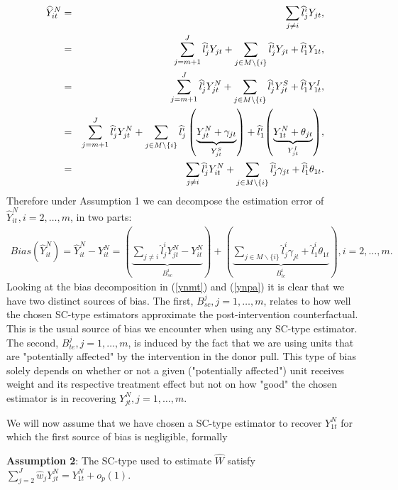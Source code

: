 \begin{eqnarray}
\widehat{Y}_{it}^N&=& \sum_{j\neq i} \widehat{l}_{j}^{i}Y_{jt}\notag,\\&=&\sum_{j=m+1}^J \widehat{l}_{j}^{i}Y_{jt}+ \sum_{j \in M \backslash \{{i} \}}\widehat{l}_{j}^{i}Y_{jt} +\widehat{l}^{i}_{1}Y_{1t}\notag,\\
&=& \sum_{j=m+1}^J \widehat{l}_{j}^{i}Y^N_{jt}+ \sum_{j \in M \backslash \{{i} \}} \widehat{l}_{j}^{i}Y^S_{jt}+\widehat{l}^{i}_{1}{Y^I_{1t}}\notag,\\
&=& \sum_{j=m+1}^J \widehat{l}_{j}^{i}Y^N_{jt}+ \sum_{j \in M \backslash \{{i} \}} \widehat{l}_{j}^{i}\left(\underbrace{Y^N_{jt}+\gamma_{jt}}_{Y^S_{jt}}\right)+\widehat{l}^{i}_{1}{\left(\underbrace{Y^N_{1t}+\theta_{jt}}_{Y^I_{jt}}\right)}\notag,\\
&=&\sum_{j\neq i}\widehat{l}_{j}^{i}  Y_{it}^N+ \sum_{j \in M \backslash \{{i} \}} \widehat{l}_{j}^{i}{\gamma_{jt}}+\widehat{l}^{i}_{1}{\theta_{1t}}\notag.
\end{eqnarray}
Therefore under Assumption 1 we can decompose the estimation error of $\widehat{Y}_{it}^N, i=2,\ldots,m$, in two parts:
\begin{eqnarray}
Bias\left(\widehat{Y}_{it}^N\right)=\widehat{Y}_{it}^N-Y^N_{it}=\left(\underbrace{\sum_{j\neq i}\widehat{l}_{j}^{i}  Y_{jt}^N-{Y}_{it}^N}_{B^i_{sc}}\right)+\left( \underbrace{\sum_{j \in M \backslash \{{i} \}} \widehat{l}_{j}^{i}{\gamma_{jt}}+\widehat{l}^{i}_{1}{\theta_{1t}}}_{B^i_{te}}\right), i=2,\ldots,m \label{ynpa}.
\end{eqnarray}
Looking at the bias decomposition in (\ref{ynmt}) and (\ref{ynpa}) it is clear that we have two distinct sources of bias. The first, $B^j_{sc}, j=1,\ldots,m$,  relates to how well the chosen SC-type estimators approximate the post-intervention counterfactual. This is the usual source of bias we encounter when using any SC-type estimator. The second, $B^j_{te}, j=1,\ldots,m$, is induced by the fact that we are using units that are "potentially affected" by the intervention in the donor pull. This type of bias solely depends on whether or not a given ("potentially affected") unit receives weight and its respective treatment effect but not on how "good" the chosen estimator is in recovering $Y_{jt}^N, j=1,\ldots,m$.   


We will now assume that we have chosen a SC-type estimator to recover $Y_{1t}^N$ for which the first source of bias is negligible, formally
\bigskip
\begin{center}
\textbf{Assumption 2}: The SC-type used to estimate $\widehat{W}$ satisfy $ \sum_{j=2}^J \widehat{w}_{j}{Y_{jt}^N}=Y_{1t}^N+o_p(1) $.
\end{center}
\bigskip


